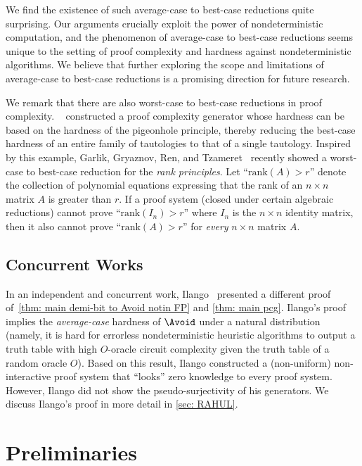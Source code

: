 We find the existence of such average-case to best-case reductions quite surprising. Our arguments crucially exploit the power of nondeterministic computation, and the phenomenon of average-case to best-case reductions seems unique to the setting of proof complexity and hardness against nondeterministic algorithms. We believe that further exploring the scope and limitations of average-case to best-case reductions is a promising direction for future research.

\def\rank{\mathrm{rank}}
We remark that there are also worst-case to best-case reductions in proof complexity. \Krajicek~\cite{krajicek2007proof} constructed a proof complexity generator whose hardness can be based on the hardness of the pigeonhole principle, thereby reducing the best-case hardness of an entire family of tautologies to that of a single tautology. Inspired by this example, Garlik, Gryaznov, Ren, and Tzameret~\cite{GGRT25} recently showed a worst-case to best-case reduction for the \emph{rank principles}. Let ``$\rank(A) > r$'' denote the collection of polynomial equations expressing that the rank of an $n\times n$ matrix $A$ is greater than $r$. If a proof system (closed under certain algebraic reductions) cannot prove ``$\rank(I_n) > r$'' where $I_n$ is the $n\times n$ identity matrix, then it also cannot prove ``$\rank(A) > r$'' for \emph{every} $n\times n$ matrix $A$.



\subsection{Concurrent Works}
In an independent and concurrent work, Ilango~\cite{Ilango25} presented a different proof of~\autoref{thm: main demi-bit to Avoid notin FP} and \autoref{thm: main pcg}. Ilango's proof implies the \emph{average-case} hardness of $\Avoid$ under a natural distribution (namely, it is hard for errorless nondeterministic heuristic algorithms to output a truth table with high $O$-oracle circuit complexity given the truth table of a random oracle $O$). Based on this result, Ilango constructed a (non-uniform) non-interactive proof system that ``looks'' zero knowledge to every proof system. However, Ilango did not show the pseudo-surjectivity of his generators. We discuss Ilango's proof in more detail in \autoref{sec: RAHUL}.


\section{Preliminaries}\label{sec: preliminaries}


